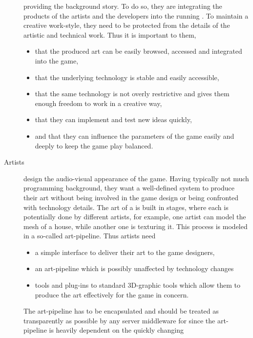 \documentclass[a4paper, 10pt]{book}
\begin{document}
\begin{description}
        providing the background story. To do
        so, they are integrating the products of the artists and the
        developers into the running \MMORG. To maintain a creative
        work-style, they need to be protected from the details of the
        artistic and technical work. Thus it is important to them,
        \begin{itemize}
            \item that the produced art can be easily browsed, accessed and
                integrated into the game,
            \item that the underlying technology is stable and easily
                accessible,
            \item that the same technology is not overly restrictive and gives
                them enough freedom to work in a creative way,
            \item that they can implement and test new ideas quickly,
            \item and that they can influence the parameters of the game easily
                and deeply to keep the game play balanced.
        \end{itemize}
    \item[Artists] design the audio-visual appearance of the game. 
        Having typically not much programming background, they want a well-defined system to produce their art without
        being involved in the game design or being confronted with
        technology details. The art of a \MMORG is built in stages, where
        each is potentially done by different artists, for example, one
        artist can model the mesh of a house, while another one is texturing
        it. This process is modeled in a so-called art-pipeline. Thus
        artists need
        \begin{itemize}
            \item a simple interface to deliver their art to the game designers,
            \item an art-pipeline which is possibly unaffected by technology
                changes
            \item tools and plug-ins to standard 3D-graphic tools which allow
                them to produce the art effectively for the game in concern. 
        \end{itemize}
        The art-pipeline has to be encapsulated and should be treated as
        transparently as possible by any server middleware for \MMORGS since
        the art-pipeline is heavily dependent on the quickly changing

\end{description}
\end{document}
